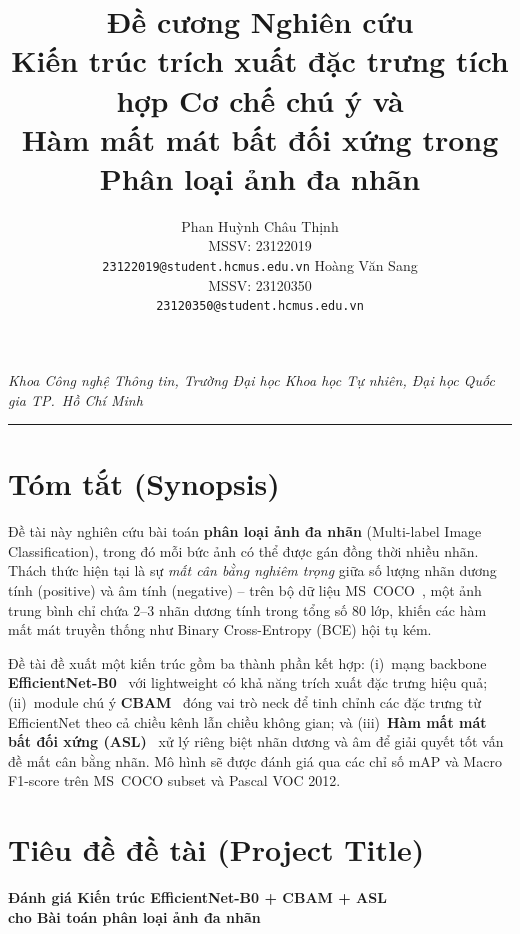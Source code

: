 \documentclass{article}
\title{%
  \textbf{Đề cương Nghiên cứu}\\[4pt]
  {\large Kiến trúc trích xuất đặc trưng tích hợp Cơ chế chú ý và}\\
  {\large Hàm mất mát bất đối xứng trong Phân loại ảnh đa nhãn}
}
\author{%
  Phan Huỳnh Châu Thịnh \\
  MSSV: 23122019 \\
  \texttt{23122019@student.hcmus.edu.vn}
  \And
  Hoàng Văn Sang \\
  MSSV: 23120350 \\
  \texttt{23120350@student.hcmus.edu.vn}
}
\begin{document}
\maketitle

\begin{center}
  {\small
    \textit{Khoa Công nghệ Thông tin,
    Trường Đại học Khoa học Tự nhiên,
    Đại học Quốc gia TP.\ Hồ Chí Minh}
  }
\end{center}

\vspace{6pt}
\noindent\rule{\linewidth}{0.8pt}

\section*{Tóm tắt (Synopsis)}

Đề tài này nghiên cứu bài toán \textbf{phân loại ảnh đa nhãn} (Multi-label Image
Classification), trong đó mỗi bức ảnh có thể được gán đồng thời nhiều nhãn.
Thách thức hiện tại là sự \textit{mất cân bằng nghiêm trọng} giữa số lượng nhãn
dương tính (positive) và âm tính (negative) -- trên bộ dữ liệu MS~COCO~\cite{lin2014coco}, một ảnh trung
bình chỉ chứa $2$--$3$ nhãn dương tính trong tổng số 80 lớp, khiến các hàm mất mát
truyền thống như Binary Cross-Entropy (BCE) hội tụ kém.

Đề tài đề xuất một kiến trúc gồm ba thành phần kết hợp: (i)~mạng backbone
\textbf{EfficientNet-B0}~\cite{tan2019efficientnet} với lightweight có khả năng trích xuất đặc trưng hiệu quả; (ii)~module chú ý \textbf{CBAM}~\cite{woo2018cbam} đóng vai trò neck để tinh chỉnh các đặc trưng từ EfficientNet theo cả chiều kênh lẫn chiều không gian; và
(iii)~\textbf{Hàm mất mát bất đối xứng (ASL)}~\cite{ridnik2021asl} xử lý riêng
biệt nhãn dương và âm để giải quyết tốt vấn đề mất cân bằng nhãn.
Mô hình sẽ được đánh giá qua các chỉ số mAP và Macro F1-score trên MS~COCO subset và Pascal VOC 2012.

\section{Tiêu đề đề tài (Project Title)}

\begin{center}
  \large\bfseries
  Đánh giá Kiến trúc EfficientNet-B0 + CBAM + ASL\\
  cho Bài toán phân loại ảnh đa nhãn\\ 
\end{center}
\end{document}

